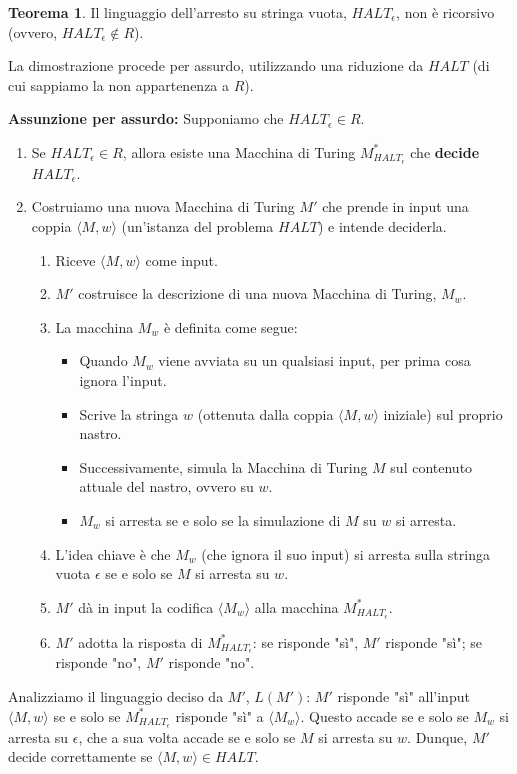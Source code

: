 \documentclass[a4paper]{article}
\makeatletter
\theoremstyle{definition} %
\newtheorem{theorem}{Teorema}
[section] %
\renewenvironment{proof}[1][\proofname]{\par
  \pushQED{\qed}%
  \normalfont \topsep6\p@\@plus6\p@\relax
  \trivlist
  \item[\hskip\labelsep
        \bfseries
    #1\@addpunct{.}]\ignorespaces
}{%
  \popQED\endtrivlist\@endpefalse
}
\makeatother
\begin{document}
\begin{theorem}
Il linguaggio dell'arresto su stringa vuota, $HALT_\epsilon$, non è ricorsivo (ovvero, $HALT_\epsilon \notin R$).
\end{theorem}
\begin{proof}
La dimostrazione procede per assurdo, utilizzando una riduzione da $HALT$ (di cui sappiamo la non appartenenza a $R$).

\textbf{Assunzione per assurdo:} Supponiamo che $HALT_\epsilon \in R$.
\begin{enumerate}
    \item Se $HALT_\epsilon \in R$, allora esiste una Macchina di Turing $M_{HALT_\epsilon}^*$ che \textbf{decide} $HALT_\epsilon$.
    \item Costruiamo una nuova Macchina di Turing $M'$ che prende in input una coppia $\langle M, w \rangle$ (un'istanza del problema $HALT$) e intende deciderla.
    \begin{enumerate}
        \item Riceve $\langle M, w \rangle$ come input.
        \item $M'$ costruisce la descrizione di una nuova Macchina di Turing, $M_{w}$.
        \item La macchina $M_w$ è definita come segue:
        \begin{itemize}
            \item Quando $M_w$ viene avviata su un qualsiasi input, per prima cosa ignora l'input.
            \item Scrive la stringa $w$ (ottenuta dalla coppia $\langle M, w \rangle$ iniziale) sul proprio nastro.
            \item Successivamente, simula la Macchina di Turing $M$ sul contenuto attuale del nastro, ovvero su $w$.
            \item $M_w$ si arresta se e solo se la simulazione di $M$ su $w$ si arresta.
        \end{itemize}
        \item L'idea chiave è che $M_w$ (che ignora il suo input) si arresta sulla stringa vuota $\epsilon$ se e solo se $M$ si arresta su $w$.
        \item $M'$ dà in input la codifica $\langle M_w \rangle$ alla macchina $M_{HALT_\epsilon}^*$.
        \item $M'$ adotta la risposta di $M_{HALT_\epsilon}^*$: se risponde "sì", $M'$ risponde "sì"; se risponde "no", $M'$ risponde "no".
    \end{enumerate}
\end{enumerate}
Analizziamo il linguaggio deciso da $M'$, $L(M')$:
$M'$ risponde "sì" all'input $\langle M, w \rangle$ se e solo se $M_{HALT_\epsilon}^*$ risponde "sì" a $\langle M_w \rangle$. Questo accade se e solo se $M_w$ si arresta su $\epsilon$, che a sua volta accade se e solo se $M$ si arresta su $w$.
Dunque, $M'$ decide correttamente se $\langle M, w \rangle \in HALT$.


\end{proof}
\end{document}
